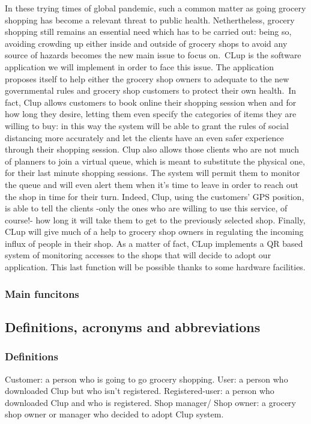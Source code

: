 In these trying times of global pandemic, such a common matter as going grocery shopping has become a relevant threat to public health. 
Nethertheless, grocery shopping still remains an essential need which has to be carried out: being so, avoiding crowding up either inside and outside of grocery shops to avoid any source of hazards becomes the new main issue to focus on.\ 
CLup is the software application we will implement in order to face this issue.
The application proposes itself to help either the grocery shop owners to adequate to the new governmental rules and grocery shop customers to protect their own health.\ 
In fact, Clup allows customers to book online their shopping session when and for how long they desire, letting them even specify the categories of items they are willing to buy: in this way the system will be able to grant the rules of social distancing more accurately and let the clients have an even safer experience through their shopping session.
Clup also allows those clients who are not much of planners to join a virtual queue, which is meant to substitute the physical one, for their last minute shopping sessions. The system will permit them to monitor the queue and will even alert them when it’s time to leave in order to reach out the shop in time for their turn. 
Indeed, Clup, using the customers’ GPS position, is able to tell the clients -only the ones who are willing to use this service, of course!- how long it will take them to get to the previously selected shop.
Finally, CLup will give much of a help to grocery shop owners in regulating the incoming influx of people in their shop. As a matter of fact, CLup implements a QR based system of monitoring accesses to the shops that will decide to adopt our application. This last function will be possible thanks to some hardware facilities.

\subsubsection{Main funcitons}
\label{subsect:mainfunctions}

\subsection{Definitions, acronyms and abbreviations}
\label{subsect:definitionsacronymsabbreviations}

\subsubsection{Definitions}
\label{subsect:definitions}
Customer: a person who is going to go grocery shopping.
User: a person who downloaded Clup but who isn't registered.
Registered-user: a person who downloaded Clup and who is registered.
Shop manager/ Shop owner: a grocery shop owner or manager who decided to adopt Clup system.

